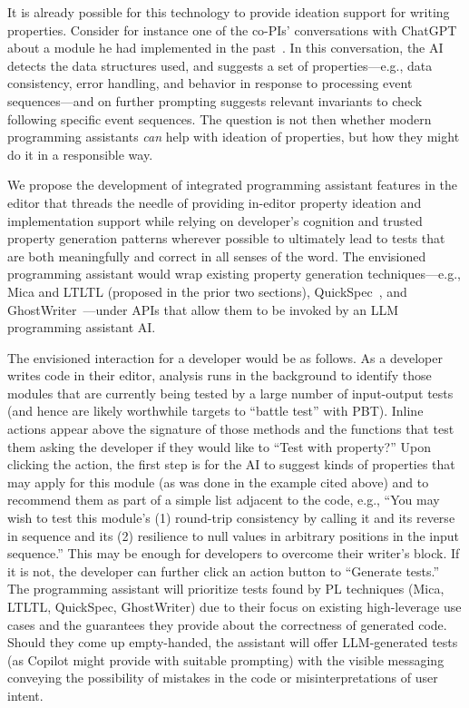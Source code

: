It is already possible for this technology to provide ideation
support for writing properties. Consider for instance one of the co-PIs'
conversations with ChatGPT about a module he had implemented in the
past~\cite{ref:chatgptpbtexample}.  In this conversation, the AI detects the data structures used,
and suggests a set of properties---e.g., data consistency, error handling, and
behavior in response to processing event sequences---and on further prompting suggests relevant
invariants to check following specific event sequences. The question is not
then whether modern programming assistants \emph{can} help with ideation of
properties, but how they might do it in a responsible way.   

We propose the development of integrated programming assistant features in the
editor that threads the needle of providing in-editor property ideation and
implementation support while relying on developer's cognition and trusted
property generation patterns wherever possible to ultimately lead to tests
that are both meaningfully and correct in all senses of the word. The envisioned
programming assistant would wrap existing property generation techniques---e.g., Mica
and LTLTL (proposed in the prior two sections), QuickSpec~\cite{ref:claessen2010quickspec}, and GhostWriter~\cite{ref:ghostwriter}---under APIs that allow them to be invoked
by an LLM programming assistant AI.

The envisioned interaction for a developer would be as follows. As a
developer writes code in their editor, analysis runs in the background to
identify those modules that are currently being tested by a large number of
input-output tests (and hence are likely worthwhile targets to ``battle test''
with PBT). Inline actions appear above the signature of those methods and the
functions that test them asking the developer if they would like to ``Test with
property?'' Upon clicking the action, the first step is for the AI to suggest
kinds of properties that may apply for this module (as was done in the example
cited above) and to recommend them as part of a simple list adjacent to the
code, e.g., ``You may wish to test this module's (1) round-trip consistency by
calling it and its reverse in sequence and its (2) resilience to null values in
arbitrary positions in the input sequence.'' This may be enough for developers
to overcome their writer's block. If it is not, the developer can further click
an action button to ``Generate tests.'' The programming assistant will
prioritize tests found by PL techniques (Mica, LTLTL, QuickSpec, GhostWriter)
due to their focus on existing high-leverage use cases and the guarantees they
provide about the correctness of generated code. Should they come up
empty-handed, the assistant will offer LLM-generated tests (as Copilot might
provide with suitable prompting) with the visible messaging conveying the
possibility of mistakes in the code or misinterpretations of user intent.

